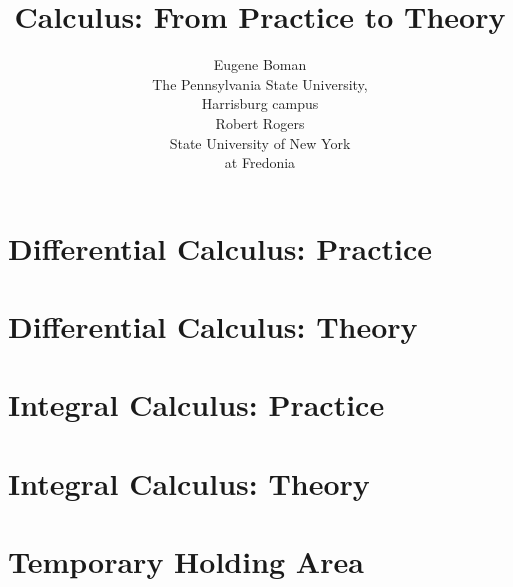 \documentclass[oneside]{book}
\begin{document}
\title{Calculus: From Practice to Theory}
\author{Eugene Boman \\The Pennsylvania State University, \\Harrisburg
  campus\\[5mm]Robert Rogers \\State University of New York \\at
  Fredonia }
\maketitle
\date{}
\tableofcontents{}





% 

\part{Differential Calculus: Practice}
\newpage{}








\part{Differential Calculus: Theory}

 

\part{Integral Calculus: Practice}
 \newpage{}
 \newpage{}




\part{Integral Calculus: Theory}
\part{Temporary Holding Area}
% 
% 

\end{document}
